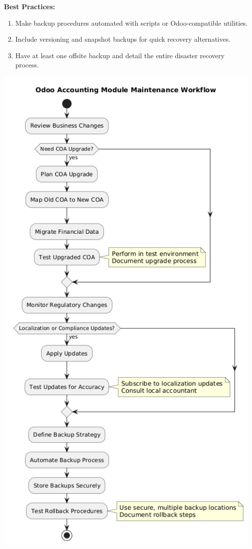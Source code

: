 \documentclass[11pt,a4paper]{article}
\begin{document}
\begin{enumerate}
\begin{minipage}{0.45\textwidth}
    \textbf{Best Practices:}
    \begin{enumerate}
        \item Make backup procedures automated with scripts or Odoo-compatible utilities.
        \item Include versioning and snapshot backups for quick recovery alternatives.
        \item Have at least one offsite backup and detail the entire disaster recovery process.
    \end{enumerate}
    \end{minipage}%
    \hfill
    \begin{minipage}{0.45\textwidth}
        \centering
        \includegraphics[width=\linewidth]{diagram/accounting_maintenance_workflow.png}
    \end{minipage}
\end{enumerate}
\end{document}
